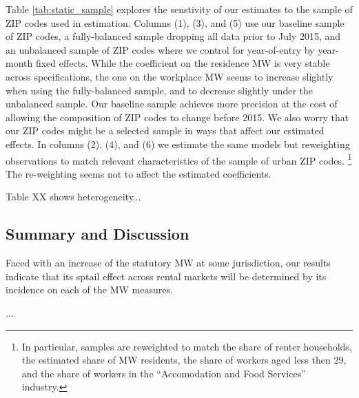 Table \ref{tab:static_sample} explores the senstivity of our estimates to 
the sample of ZIP codes used in estimation.
Columns (1), (3), and (5) use our baseline sample of ZIP codes, 
a fully-balanced sample dropping all data prior to July 2015, and
an unbalanced sample of ZIP codes where we control for year-of-entry by
year-month fixed effects.
While the coefficient on the residence MW is very stable across specifications,
the one on the workplace MW seems to increase slightly when using the fully-balanced
sample, and to decrease slightly under the unbalanced sample.
Our baseline sample achieves more precision at the cost of allowing the 
composition of ZIP codes to change before 2015.
We also worry that our ZIP codes might be a selected sample in ways that affect
our estimated effects.
In columns (2), (4), and (6) we estimate the same models but reweighting 
observations to match relevant characteristics of the sample of urban 
ZIP codes.%
\footnote{In particular, samples are reweighted to match the share of renter
households, the estimated share of MW residents, the share of workers aged
less then 29, and the share of workers in the ``Accomodation and Food Services''
industry.}
The re-weighting seems not to affect the estimated coefficients.

Table XX shows heterogeneity...

\subsection{Summary and Discussion}
\label{sec:results_discussion}

Faced with an increase of the statutory MW at some jurisdiction, our results
indicate that its sptail effect across rental markets will be determined by 
its incidence on each of the MW measures.

...

